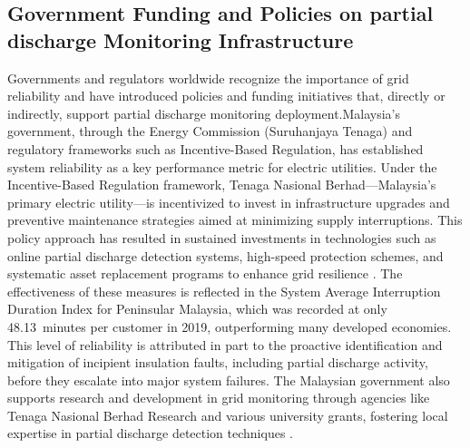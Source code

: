 \subsection{Government Funding and Policies on partial discharge Monitoring Infrastructure}

Governments and regulators worldwide recognize the importance of grid reliability and have introduced policies and funding initiatives that, directly or indirectly, support partial discharge monitoring deployment.Malaysia’s government, through the Energy Commission (Suruhanjaya Tenaga) and regulatory frameworks such as Incentive-Based Regulation, has established system reliability as a key performance metric for electric utilities. Under the Incentive-Based Regulation framework, Tenaga Nasional Berhad—Malaysia’s primary electric utility—is incentivized to invest in infrastructure upgrades and preventive maintenance strategies aimed at minimizing supply interruptions. This policy approach has resulted in sustained investments in technologies such as online partial discharge detection systems, high-speed protection schemes, and systematic asset replacement programs to enhance grid resilience \parencite{Abdullah_2019}. The effectiveness of these measures is reflected in the System Average Interruption Duration Index for Peninsular Malaysia, which was recorded at only 48.13~minutes per customer in 2019, outperforming many developed economies. This level of reliability is attributed in part to the proactive identification and mitigation of incipient insulation faults, including partial discharge activity, before they escalate into major system failures. The Malaysian government also supports research and development in grid monitoring through agencies like Tenaga Nasional Berhad Research and various university grants, fostering local expertise in partial discharge detection techniques \parencite{Chan_2023}.

